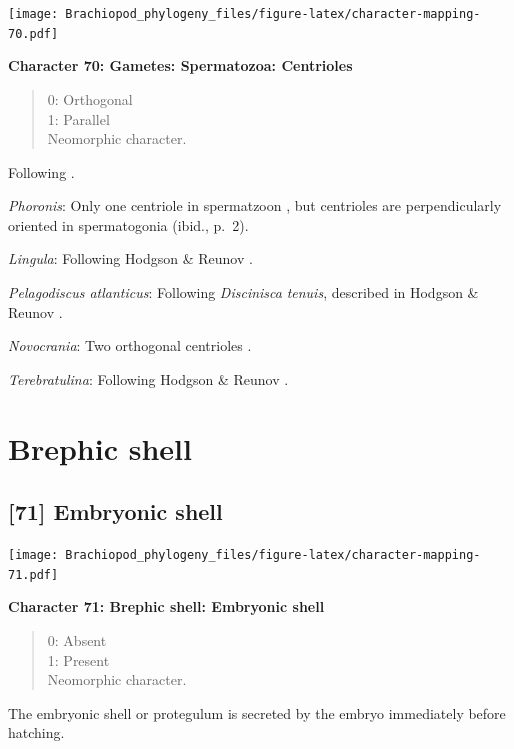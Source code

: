 \documentclass[]{book}
\theoremstyle{definition}
\theoremstyle{definition}
\theoremstyle{definition}
\theoremstyle{remark}
\begin{document}
\texttt{[image: Brachiopod\_phylogeny\_files/figure-latex/character-mapping-70.pdf]}

\textbf{Character 70: Gametes: Spermatozoa: Centrioles}

\begin{quote}
0: Orthogonal\\
1: Parallel\\
Neomorphic character.
\end{quote}

Following \citet{Hodgson1994Ultrastructureof}.

\emph{Phoronis}: Only one centriole in spermatzoon
\citep[p.~7]{Reunov2004Ultrastructuralstudy}, but centrioles are
perpendicularly oriented in spermatogonia (ibid., p.~2).

\emph{Lingula}: Following Hodgson \& Reunov
\citeyearpar{Hodgson1994Ultrastructureof}.

\emph{Pelagodiscus atlanticus}: Following \emph{Discinisca}
\emph{tenuis}, described in Hodgson \& Reunov
\citeyearpar{Hodgson1994Ultrastructureof}.

\emph{Novocrania}: Two orthogonal centrioles
\citep{Afzelius1978Finestructure}.

\emph{Terebratulina}: Following Hodgson \& Reunov
\citeyearpar{Hodgson1994Ultrastructureof}.

\hypertarget{brephic-shell}{%
\section{Brephic shell}\label{brephic-shell}}

\hypertarget{embryonic-shell}{%
\subsection*{{[}71{]} Embryonic shell}\label{embryonic-shell}}

\texttt{[image: Brachiopod\_phylogeny\_files/figure-latex/character-mapping-71.pdf]}

\textbf{Character 71: Brephic shell: Embryonic shell}

\begin{quote}
0: Absent\\
1: Present\\
Neomorphic character.
\end{quote}

The embryonic shell or protegulum is secreted by the embryo immediately
before hatching.
\end{document}

